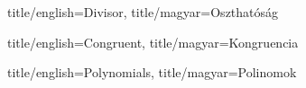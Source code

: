 \begin{Section}{
  title/english=Divisor,
  title/magyar=Oszthatóság}

  

\end{Section}

\begin{Section}{
  title/english=Congruent,
  title/magyar=Kongruencia}

  

\end{Section}

\begin{Section}{
  title/english=Polynomials,
  title/magyar=Polinomok}

  

\end{Section}


